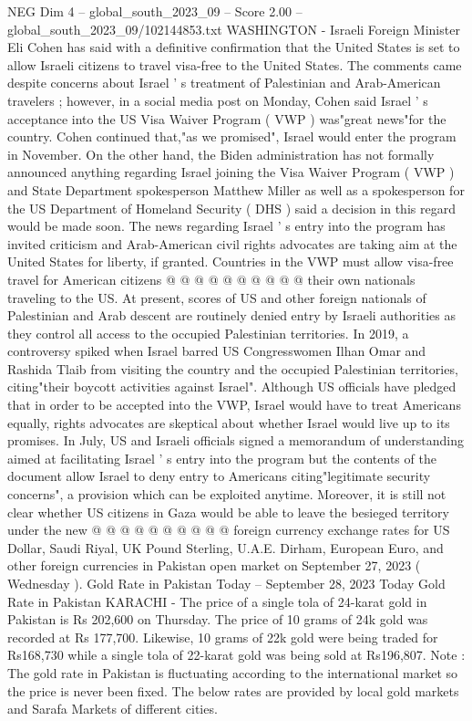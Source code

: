 \begin{textsample}{NEG Dim 4 – global\_south\_2023\_09 – Score 2.00 – global\_south\_2023\_09/102144853.txt}  \label{ex:f4_neg_021}
WASHINGTON - Israeli Foreign Minister Eli Cohen has said with a definitive confirmation that the United States is set to allow Israeli citizens to travel visa-free to the United States.
The comments came despite concerns about Israel ' s treatment of Palestinian and Arab-American travelers ; however, in a social media post on Monday, Cohen said Israel ' s acceptance into the US Visa Waiver Program ( VWP ) was"great news"for the country.
Cohen continued that,"as we promised", Israel would enter the program in November.
On the other hand, the Biden administration has not formally announced anything regarding Israel joining the Visa Waiver Program ( VWP ) and State Department spokesperson Matthew Miller as well as a spokesperson for the US Department of Homeland Security ( DHS ) said a decision in this regard would be made soon.
The news regarding Israel ' s entry into the program has invited criticism and Arab-American civil rights advocates are taking aim at the United States for liberty, if granted.
Countries in the VWP must allow visa-free travel for American citizens @ @ @ @ @ @ @ @ @ @ their own nationals traveling to the US.
At present, scores of US and other foreign nationals of Palestinian and Arab descent are routinely denied entry by Israeli authorities as they control all access to the occupied Palestinian territories.
In 2019, a controversy spiked when Israel barred US Congresswomen Ilhan Omar and Rashida Tlaib from visiting the country and the occupied Palestinian territories, citing"their boycott activities against Israel".
Although US officials have pledged that in order to be accepted into the VWP, Israel would have to treat Americans equally, rights advocates are skeptical about whether Israel would live up to its promises.
In July, US and Israeli officials signed a memorandum of understanding aimed at facilitating Israel ' s entry into the program but the contents of the document allow Israel to deny entry to Americans citing"legitimate security concerns", a provision which can be exploited anytime.
Moreover, it is still not clear whether US citizens in Gaza would be able to leave the besieged territory under the new @ @ @ @ @ @ @ @ @ @ foreign currency exchange rates for US Dollar, Saudi Riyal, UK Pound Sterling, U.A.E.
Dirham, European Euro, and other foreign currencies in Pakistan open market on September 27, 2023 ( Wednesday ).
Gold Rate in Pakistan Today -- September 28, 2023 Today Gold Rate in Pakistan KARACHI - The price of a single tola of 24-karat gold in Pakistan is Rs 202,600 on Thursday.
The price of 10 grams of 24k gold was recorded at Rs 177,700.
Likewise, 10 grams of 22k gold were being traded for Rs168,730 while a single tola of 22-karat gold was being sold at Rs196,807.
Note : The gold rate in Pakistan is fluctuating according to the international market so the price is never been fixed.
The below rates are provided by local gold markets and Sarafa Markets of different cities.

\end{textsample}
